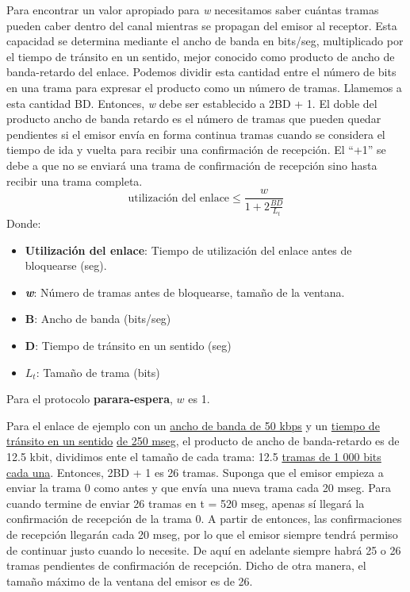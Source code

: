 \documentclass[
	12pt, %
	fleqn, %
	a4paper, %
	oneside, %
]{LegrandOrangeBook}
\begin{document}
\begin{definition}
Para encontrar un valor apropiado para \textit{w} necesitamos saber cuántas tramas pueden caber dentro del canal mientras se propagan del emisor al receptor. Esta capacidad se determina mediante el ancho de banda en bits/seg, multiplicado por el tiempo de tránsito en un sentido, mejor conocido como producto de ancho de banda-retardo del enlace. Podemos dividir esta cantidad entre el número de bits en una trama para expresar el producto como un número de tramas. Llamemos a esta cantidad BD. Entonces, \textit{w} debe ser establecido a 2BD + 1. El doble del producto ancho de banda retardo es el número de tramas que pueden quedar pendientes si el emisor envía en forma continua tramas cuando se considera el tiempo de ida y vuelta para recibir una confirmación de recepción. El ``+1'' se debe a que no se enviará una trama de confirmación de recepción sino hasta recibir una trama completa.
\begin{equation}
\text{utilización del enlace}\leqslant\frac{w}{1+2\frac{BD}{L_t}}
\label{eq:utilizacion de enlace}
\end{equation}
Donde:
\begin{itemize}
\item \textbf{Utilización del enlace}: Tiempo de utilización del enlace antes de bloquearse (seg).
\item \textbf{\textit{w}}: Número de tramas antes de bloquearse, tamaño de la ventana.
\item \textbf{B}: Ancho de banda (bits/seg)
\item \textbf{D}: Tiempo de tránsito en un sentido (seg)
\item \textbf{$L_t$}: Tamaño de trama (bits)
\end{itemize}
Para el protocolo \textbf{parara-espera}, $w$ es 1.
\end{definition}
Para el enlace de ejemplo con un \underline{ancho de banda de 50 kbps} y un \underline{tiempo de tránsito en un sentido} \underline{de 250 mseg}, el producto de ancho de banda-retardo es de 12.5 kbit, dividimos ente el tamaño de cada trama: 12.5 \underline{tramas de 1 000 bits cada una}. Entonces, 2BD + 1 es 26 tramas. Suponga que el emisor empieza a enviar la trama 0 como antes y que envía una nueva trama cada 20 mseg. Para cuando termine de enviar 26 tramas en t = 520 mseg, apenas sí llegará la confirmación de recepción de la trama 0. A partir de entonces, las confirmaciones de recepción llegarán cada 20 mseg, por lo que el emisor siempre tendrá permiso de continuar justo cuando lo necesite. De aquí en adelante siempre habrá 25 o 26 tramas pendientes de confirmación de recepción. Dicho de otra manera, el tamaño máximo de la ventana del emisor es de 26.\\
\end{document}
